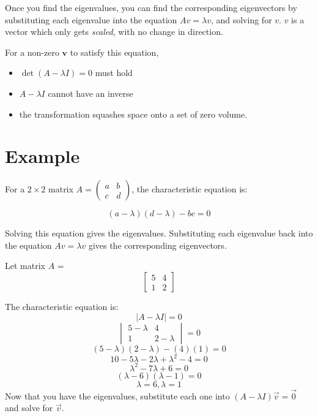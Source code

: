Once you find the eigenvalues, you can find the corresponding eigenvectors by substituting each eigenvalue into the equation $Av = \lambda
v$, and solving for $v$. $v$ is a vector which only gets \emph{scaled}, with no change in direction. 

For a non-zero $\mathbf v$ to satisfy this equation,
\begin{itemize}
  \item $\det(A - \lambda I) = 0$ must hold
  \item $A-\lambda I$ cannot have an inverse
  \item the transformation squashes space onto a set of zero volume.
\end{itemize}

\section{Example}

For a $2 \times 2$ matrix $A = \begin{pmatrix} a & b \\ c &
  d \end{pmatrix}$, the characteristic equation is:

\begin{equation}
(a - \lambda)(d - \lambda) - bc = 0
\end{equation}

Solving this equation  gives the eigenvalues. Substituting each
eigenvalue back into the equation $Av = \lambda v$ gives the
corresponding eigenvectors.

Let matrix $A$ =
$$\begin{bmatrix}
5 & 4\\
 1 & 2 
\end{bmatrix} $$

The characteristic equation is: 
$$|A - \lambda I| = 0$$ 
$$\begin{vmatrix}
5 - \lambda & 4\\
 1 & 2- \lambda
\end{vmatrix} = 0$$
$$(5 - \lambda) (2 - \lambda) - (4)(1) = 0$$
$$10 - 5\lambda - 2\lambda + \lambda^2 - 4 = 0$$
$$\lambda^2 - 7\lambda + 6 = 0$$
$$(\lambda - 6)(\lambda - 1) = 0$$
$$\lambda = 6, \lambda = 1$$
Now that you have the eigenvalues, substitute each one into
$(A - \lambda I)\vec{v} = \vec{0}$ and solve for $\vec{v}$.

